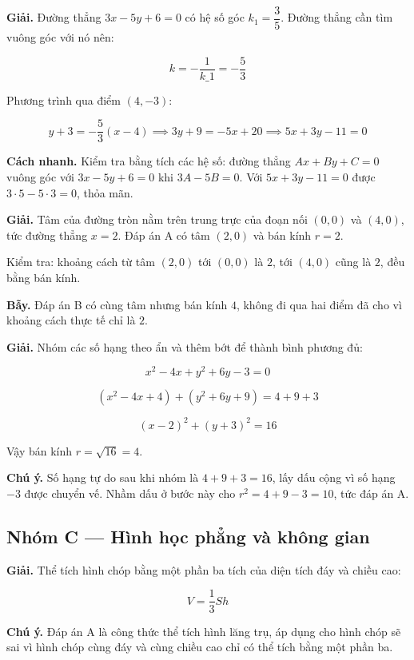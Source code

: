 \documentclass[11pt, a4paper]{article}
\begin{document}
\begin{dapan}[17 — Đáp án D]
\textbf{Giải.} Đường thẳng $3x - 5y + 6 = 0$ có hệ số góc $k_1 = \dfrac{3}{5}$. Đường thẳng cần tìm vuông góc với nó nên:

$$k = -\frac{1}{k\_1} = -\frac{5}{3}$$

Phương trình qua điểm $(4, -3)$:

$$y + 3 = -\frac{5}{3}(x - 4) \implies 3y + 9 = -5x + 20 \implies 5x + 3y - 11 = 0$$

\textbf{Cách nhanh.} Kiểm tra bằng tích các hệ số: đường thẳng $Ax + By + C = 0$ vuông góc với $3x - 5y + 6 = 0$ khi $3A - 5B = 0$. Với $5x + 3y - 11 = 0$ được $3 \cdot 5 - 5 \cdot 3 = 0$, thỏa mãn.
\end{dapan}

\begin{dapan}[18 — Đáp án A]
\textbf{Giải.} Tâm của đường tròn nằm trên trung trực của đoạn nối $(0,0)$ và $(4,0)$, tức đường thẳng $x = 2$. Đáp án A có tâm $(2, 0)$ và bán kính $r = 2$.

Kiểm tra: khoảng cách từ tâm $(2,0)$ tới $(0,0)$ là $2$, tới $(4,0)$ cũng là $2$, đều bằng bán kính.

\textbf{Bẫy.} Đáp án B có cùng tâm nhưng bán kính $4$, không đi qua hai điểm đã cho vì khoảng cách thực tế chỉ là $2$.
\end{dapan}

\begin{dapan}[19 — Đáp án D]
\textbf{Giải.} Nhóm các số hạng theo ẩn và thêm bớt để thành bình phương đủ:

$$x^2 - 4x + y^2 + 6y - 3 = 0$$

$$(x^2 - 4x + 4) + (y^2 + 6y + 9) = 4 + 9 + 3$$

$$(x - 2)^2 + (y + 3)^2 = 16$$

Vậy bán kính $r = \sqrt{16} = 4$.

\textbf{Chú ý.} Số hạng tự do sau khi nhóm là $4 + 9 + 3 = 16$, lấy dấu cộng vì số hạng $-3$ được chuyển vế. Nhầm dấu ở bước này cho $r^2 = 4 + 9 - 3 = 10$, tức đáp án A.
\end{dapan}

\subsection*{Nhóm C — Hình học phẳng và không gian}

\begin{dapan}[20 — Đáp án C]
\textbf{Giải.} Thể tích hình chóp bằng một phần ba tích của diện tích đáy và chiều cao:

$$V = \frac{1}{3}Sh$$

\textbf{Chú ý.} Đáp án A là công thức thể tích hình lăng trụ, áp dụng cho hình chóp sẽ sai vì hình chóp cùng đáy và cùng chiều cao chỉ có thể tích bằng một phần ba.
\end{dapan}
\end{document}

